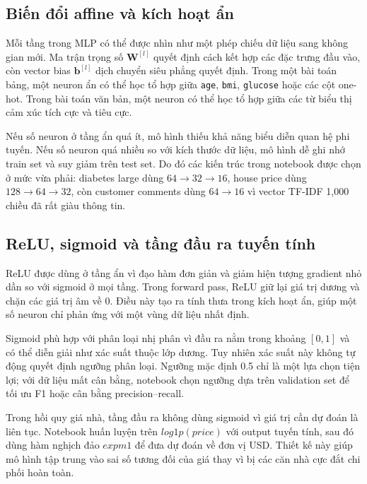 \documentclass[12pt,a4paper]{report}
\begin{document}
\subsection{Biến đổi affine và kích hoạt ẩn}
Mỗi tầng trong MLP có thể được nhìn như một phép chiếu dữ liệu sang không gian mới.
Ma trận trọng số $\mathbf{W}^{[l]}$ quyết định cách kết hợp các đặc trưng đầu vào, còn vector bias $\mathbf{b}^{[l]}$ dịch chuyển siêu phẳng quyết định.
Trong một bài toán bảng, một neuron ẩn có thể học tổ hợp giữa \texttt{age}, \texttt{bmi}, \texttt{glucose} hoặc các cột one-hot.
Trong bài toán văn bản, một neuron có thể học tổ hợp giữa các từ biểu thị cảm xúc tích cực và tiêu cực.

Nếu số neuron ở tầng ẩn quá ít, mô hình thiếu khả năng biểu diễn quan hệ phi tuyến.
Nếu số neuron quá nhiều so với kích thước dữ liệu, mô hình dễ ghi nhớ train set và suy giảm trên test set.
Do đó các kiến trúc trong notebook được chọn ở mức vừa phải: diabetes large dùng $64 \to 32 \to 16$, house price dùng $128 \to 64 \to 32$, còn customer comments dùng $64 \to 16$ vì vector TF-IDF 1,000 chiều đã rất giàu thông tin.

\subsection{ReLU, sigmoid và tầng đầu ra tuyến tính}
ReLU được dùng ở tầng ẩn vì đạo hàm đơn giản và giảm hiện tượng gradient nhỏ dần so với sigmoid ở mọi tầng.
Trong forward pass, ReLU giữ lại giá trị dương và chặn các giá trị âm về 0.
Điều này tạo ra tính thưa trong kích hoạt ẩn, giúp một số neuron chỉ phản ứng với một vùng dữ liệu nhất định.

Sigmoid phù hợp với phân loại nhị phân vì đầu ra nằm trong khoảng $[0,1]$ và có thể diễn giải như xác suất thuộc lớp dương.
Tuy nhiên xác suất này không tự động quyết định ngưỡng phân loại.
Ngưỡng mặc định 0.5 chỉ là một lựa chọn tiện lợi; với dữ liệu mất cân bằng, notebook chọn ngưỡng dựa trên validation set để tối ưu F1 hoặc cân bằng precision--recall.

Trong hồi quy giá nhà, tầng đầu ra không dùng sigmoid vì giá trị cần dự đoán là liên tục.
Notebook huấn luyện trên $log1p(price)$ với output tuyến tính, sau đó dùng hàm nghịch đảo $expm1$ để đưa dự đoán về đơn vị USD.
Thiết kế này giúp mô hình tập trung vào sai số tương đối của giá thay vì bị các căn nhà cực đắt chi phối hoàn toàn.
\end{document}
